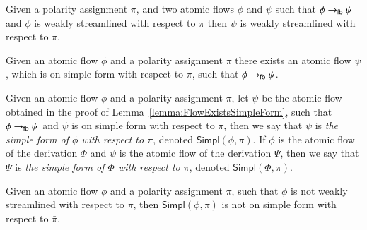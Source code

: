 \begin{lemma}\label{lemma:FourBoxesStreamlining}
Given a polarity assignment $\pi$, and two atomic flows $\phi$ and $\psi$ such that $\phi\to_{\mathsf{fb}}\psi$ and $\phi$ is weakly streamlined with respect to $\pi$ then $\psi$ is weakly streamlined with respect to $\pi$.
\end{lemma}


\begin{lemma}\label{lemma:FlowExistsSimpleForm}
Given an atomic flow $\phi$ and a polarity assignment $\pi$ there exists an atomic flow $\psi$, which is on simple form with respect to $\pi$, such that $\phi\to_{\mathsf{fb}}\psi$.
\end{lemma}


\newcommand{\Simpl}{\mathsf{Simpl}}
\begin{definition}\label{definition:TheSimpleForm}
Given an atomic flow $\phi$ and a polarity assignment $\pi$, let $\psi$ be the atomic flow obtained in the proof of Lemma~\vref{lemma:FlowExistsSimpleForm}, such that $\phi\to_{\mathsf{fb}}\psi$ and $\psi$ is on simple form with respect to $\pi$, then we say that $\psi$ is \emph{the simple form of $\phi$ with respect to $\pi$}, denoted $\Simpl(\phi,\pi)$. If $\phi$ is the atomic flow of the derivation $\Phi$ and $\psi$ is the atomic flow of the derivation $\Psi$, then we say that $\Psi$ is \emph{the simple form of $\Phi$ with respect to $\pi$}, denoted $\Simpl(\Phi,\pi)$.
\end{definition}


\begin{remark}\label{remark:FourBoxesDestroySimpleForm}
Given an atomic flow $\phi$ and a polarity assignment $\pi$, such that $\phi$ is not weakly streamlined with respect to $\bar\pi$, then $\Simpl(\phi,\pi)$ is not on simple form with respect to $\bar\pi$.
\end{remark}
